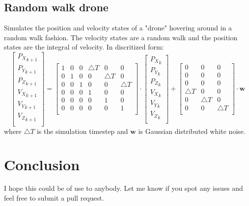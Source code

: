 \documentclass{article}
\begin{document}
\subsection{Random walk drone}
Simulates the position and velocity states of a "drone" hovering around in a random walk fashion. The velocity states are a random walk and the position states are the integral of velocity. In discritized form:
\begin{equation}
\begin{bmatrix}
{P_X}_{k+1}\\
{P_Y}_{k+1}\\
{P_Z}_{k+1}\\
{V_X}_{k+1}\\
{V_Y}_{k+1}\\
{V_Z}_{k+1}\\
\end{bmatrix} = \begin{bmatrix}
1 & 0 & 0 & \triangle T & 0 & 0 \\
0 & 1 & 0 & 0 & \triangle T & 0 \\
0 & 0 & 1 & 0 & 0 & \triangle T \\
0 & 0 & 0 & 1 & 0 & 0 \\
0 & 0 & 0 & 0 & 1 & 0 \\
0 & 0 & 0 & 0 & 0 & 1 \\
\end{bmatrix}
\cdot
\begin{bmatrix}
{P_X}_{k}\\
{P_Y}_{k}\\
{P_Z}_{k}\\
{V_X}_{k}\\
{V_Y}_{k}\\
{V_Z}_{k}\\
\end{bmatrix}
+
\begin{bmatrix}
0 & 0 & 0 \\
0 & 0 & 0 \\
0 & 0 & 0 \\
\triangle T & 0 & 0 \\
0 & \triangle T & 0 \\
0 & 0 & \triangle T \\
\end{bmatrix}
\cdot
\mathbf{w}
\end{equation}
where \(\triangle T\) is the simulation timestep and \(\mathbf{w}\) is Gaussian distributed white noise.

\section{Conclusion}
I hope this could be of use to anybody. Let me know if you spot any issues and feel free to submit a pull request.
\end{document}
